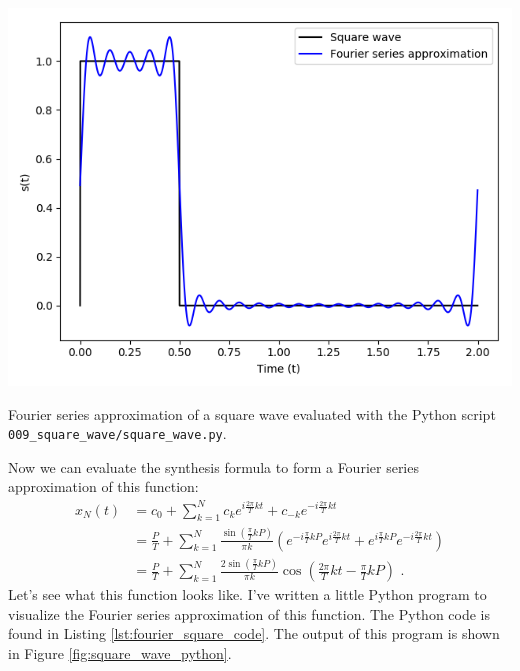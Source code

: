 \begin{marginfigure}
\begin{center}
\includegraphics[width=\textwidth]{ch07/figures/square_python.png}
\end{center}
\caption{Fourier series approximation of a square wave evaluated with the Python script \texttt{009\_square\_wave/square\_wave.py}.}
\label{fig:square_wave_python}
\end{marginfigure}

Now we can evaluate the synthesis formula to form a Fourier series approximation of this function:
\begin{align}
x_N(t) & = c_0 + \sum_{k=1}^{N} c_k e^{i\frac{2\pi}{T}kt} + c_{-k} e^{-i\frac{2\pi}{T}kt} \\
   & = \frac{P}{T} + \sum_{k=1}^{N} \frac{\sin\left(\frac{\pi}{T} kP\right)}{\pi k}  \left(e^{-i\frac{\pi}{T}kP}e^{i\frac{2\pi}{T}kt} + e^{i\frac{\pi}{T}kP}e^{-i\frac{2\pi}{T}kt}\right) \\
   & = \frac{P}{T} + \sum_{k=1}^{N} \frac{2\sin\left(\frac{\pi}{T} kP\right)}{\pi k} \cos\left( \frac{2\pi}{T}kt-\frac{\pi}{T}kP\right) \,\,.
\end{align}
Let's see what this function looks like. I've written a little Python
program to visualize the Fourier series approximation of this
function. The Python code is found in
Listing \ref{lst:fourier_square_code}. The output of this program is shown in Figure \ref{fig:square_wave_python}.



